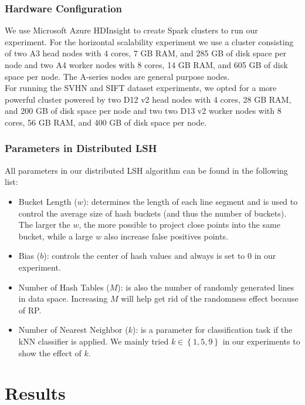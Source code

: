 \documentclass[letterpaper,twocolumn,10pt]{article}
\theoremstyle{definition}
\begin{document}
\subsubsection{Hardware Configuration}

We use Microsoft Azure HDInsight to create Spark clusters to run our 
experiment. For the horizontal scalability experiment we use a cluster consisting 
of two A3 head nodes with 4 cores, 7 GB RAM, and 285 GB of disk space per node and 
two A4 worker nodes with 8 cores, 14 GB RAM, and 605 GB of disk space per node. The 
A-series nodes are general purpose nodes.  \\ 

For running the SVHN and SIFT dataset experiments, we opted for a more powerful 
cluster powered by two D12 v2 head nodes with 4 cores, 28 GB RAM, and 200 GB of 
disk space per node and two two D13 v2 worker nodes with 8 cores, 56 GB RAM, and 
400 GB of disk space per node. \\

\subsubsection{Parameters in Distributed LSH }

All parameters in our distributed LSH algorithm can be found in the following list:

\begin{itemize}
	\item Bucket Length ($w$): determines the length of each line segment and is used to control the average size of hash buckets (and thus the number of buckets). The larger the $w$, the more possible to project close points into the same bucket, while a large $w$ also increase false positives points.
	\item Bias ($b$): controls the center of hash values and always is set to 0 in our experiment.
	\item Number of Hash Tables ($M$): is also the number of randomly generated lines in data space. Increasing $M$ will help get rid of the randomness effect because of RP. 
	\item Number of Nearest Neighbor ($k$): is a parameter for classification task if the kNN classifier is applied. We mainly tried $k \in \left\{1, 5, 9\right\}$ in our experiments to show the effect of $k$.
\end{itemize}

\section{Results}
\end{document}
